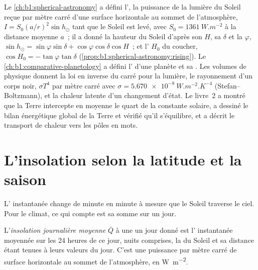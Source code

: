 \begin{recall}
Le \cref{ch:b1:spherical-astronomy} a défini l', la puissance de la lumière du Soleil
reçue par mètre carré d'une surface horizontale au sommet de l'atmosphère,
$I = S_0(a/r)^2\sin h_\odot$ tant que le Soleil est levé, avec $S_0 = \qty{1361}{W.m^{-2}}$
à la distance moyenne $a$~; il a donné la hauteur du Soleil d'après son  $H$, sa
 $\delta$ et la  $\varphi$,
$\sin h_\odot = \sin\varphi\sin\delta + \cos\varphi\cos\delta\cos H$~; et l' $H_0$ du coucher, $\cos H_0 = -\tan\varphi\tan\delta$
(\cref{prop:b1:spherical-astronomy:rising}). Le \cref{ch:b1:comparative-planetology}
a défini l' d'une planète et sa . Les volumes de
physique donnent la loi en inverse du carré pour la lumière, le rayonnement d'un corps noir,
$\sigma T^4$ par mètre carré avec $\sigma = \qty{5.670e-8}{W.m^{-2}.K^{-4}}$
(Stefan--Boltzmann), et la chaleur latente d'un changement d'état. Le livre~2 a montré que
la Terre intercepte en moyenne le quart de la constante solaire, a dessiné le bilan
énergétique global de la Terre et vérifié qu'il s'équilibre, et a décrit le
transport de chaleur vers les pôles en mots.
\end{recall}

\section{L'insolation selon la latitude et la saison}\label{sec:b1:radiation-heat-transport:insolation}

L' instantanée change de minute en minute à mesure que le Soleil traverse le
ciel. Pour le climat, ce qui compte est sa somme sur un jour.

\begin{definition}\label{def:b1:radiation-heat-transport:daily-insolation}
L'\emph{insolation journalière moyenne} $\bar Q$ à une 
un jour donné est l' instantanée moyennée sur les 24 heures de ce
jour, nuits comprises, la  du Soleil et sa distance étant tenues à
leurs valeurs du jour. C'est une puissance par mètre carré de surface horizontale au
sommet de l'atmosphère, en \unit{W.m^{-2}}.
\end{definition}

